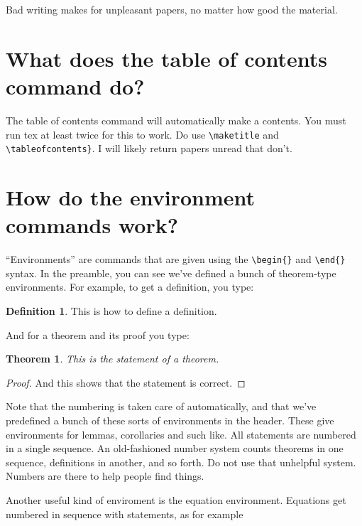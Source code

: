 \documentclass[openany, amssymb, psamsfonts]{amsart}
\newtheorem{thm}{Theorem}[section]
\theoremstyle{definition}
\newtheorem{defn}{Definition}[section]
\numberwithin{equation}{section}
\begin{document}
Bad writing makes for unpleasant papers, no matter how good the material.


\section{What does the table of contents command do?}

The table of contents command will automatically make a contents.
You must run tex at least twice for this to work.  Do use \verb|\maketitle| and \verb|\tableofcontents}|.  I will likely return papers unread that don't. 

\section{How do the environment commands work?}

``Environments'' are commands that are given using the \verb|\begin{}|
  and \verb|\end{}| syntax. In the preamble, you can see we've defined
  a bunch of theorem-type environments.  For example, to get a definition, 
you type:

\begin{defn}  This is how to define a definition.
\end{defn}

And for a theorem and its proof you type:

\begin{thm}
This is the statement of a theorem.
\end{thm}
\begin{proof}
And this shows that the statement is correct.
\end{proof}

Note that the numbering is taken care of automatically, and that we've predefined a bunch of these sorts of environments in the header.  These give environments for  lemmas, corollaries and such like.  All statements are numbered in a single sequence.  An old-fashioned number system counts theorems in one sequence, definitions in another, and so forth.  Do not use that unhelpful system.  Numbers are there to help people find things.  

Another useful kind of enviroment is the equation environment.  Equations
get numbered in sequence with statements, as for example
\end{document}
